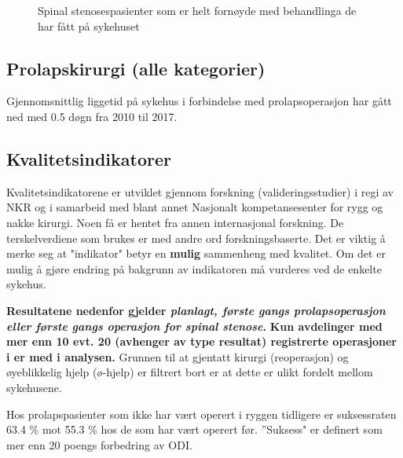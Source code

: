 \documentclass [norsk,a4paper,twoside]{article}\usepackage[]{graphicx}\usepackage[]{color}
\begin{document}
\begin{figure}[h] 
\caption{Spinal stenosespasienter som er helt fornøyde med behandlinga de har fått på sykehuset}
\label{fig:FornoydAvdSS}
\end{figure}


\subsection{Prolapskirurgi (alle kategorier)}



Gjennomsnittlig liggetid på sykehus i forbindelse med prolapsoperasjon har gått ned med 
0.5 døgn fra 2010 til 2017.



\clearpage

\subsection{Kvalitetsindikatorer}

Kvalitetsindikatorene er  utviklet gjennom forskning (valideringsstudier)  i regi av NKR 
og i samarbeid med blant annet Nasjonalt kompetansesenter for rygg og nakke kirurgi. 
Noen få er hentet fra annen internasjonal forskning.  De terskelverdiene som brukes er med andre 
ord forskningsbaserte. Det er viktig å merke seg at "indikator" betyr en \textbf{mulig} sammenheng 
med kvalitet. Om det er mulig å gjøre endring på bakgrunn av indikatoren må vurderes ved de enkelte sykehus.




\textbf{Resultatene nedenfor gjelder  \textit{planlagt, første gangs prolapsoperasjon 
eller første gangs operasjon for spinal stenose}.} 
\textbf{Kun avdelinger med mer enn 10 evt. 20 (avhenger av type resultat) registrerte operasjoner i er med i
analysen.}
Grunnen til at gjentatt kirurgi (reoperasjon) og øyeblikkelig hjelp (ø-hjelp)
er filtrert bort er at dette er ulikt fordelt mellom sykehusene.



Hos prolapspasienter som ikke har vært operert i ryggen tidligere er 
suksessraten 63.4 \% mot 55.3 \%
hos de som har vært operert før. 
''Suksess" er definert som mer enn 20 poengs forbedring av ODI. 
\end{document}
